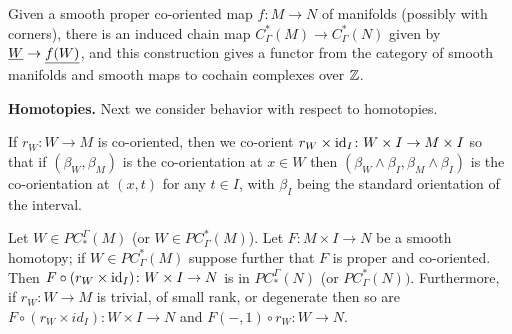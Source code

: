 \begin{corollary}
	Given a smooth proper co-oriented map $f \colon M \to N$ of manifolds (possibly with corners), there is an induced chain map $C^*_\Gamma(M) \to C^*_\Gamma(N)$ given by $\underline{W} \to \underline{f(W)}$, and this construction gives a functor from the category of smooth manifolds and smooth maps to cochain complexes over $\mathbb{Z}$.
\end{corollary}

\noindent\textbf{Homotopies.} Next we consider behavior with respect to homotopies.

\begin{convention}
	If $r_W \colon W \to M$ is co-oriented, then we co-orient $r_W \times \mathrm{id}_I \colon W \times I \to M \times I$ so that if $(\beta_W,\beta_M)$ is the co-orientation at $x \in W$ then $(\beta_W \wedge \beta_I,\beta_M \wedge \beta_I)$ is the co-orientation at $(x,t)$ for any $t \in I$, with $\beta_I$ being the standard orientation of the interval.
\end{convention}

\begin{lemma}\label{L: dessicated homotopy}
	Let $W \in PC_*^\Gamma(M)$ (or $W \in PC^*_\Gamma(M)$).
	Let $F \colon M \times I \to N$ be a smooth homotopy; if $W \in PC^*_\Gamma(M)$ suppose further that $F$ is proper and co-oriented. Then $F \circ (r_W \times \mathrm{id}_I) \colon W \times I \to N$ is in $PC_*^\Gamma(N)$ (or $PC^*_\Gamma(N))$. Furthermore,
	if $r_W: W \to M$ is trivial, of small rank, or
	degenerate then so are
	$F \circ (r_W \times id_I) \colon W \times I \to N$ and $F(-,1) \circ r_W: W \to N$.
\end{lemma}

